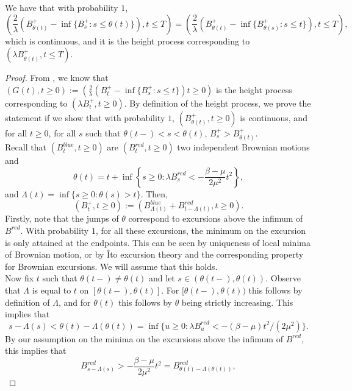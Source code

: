 \begin{lemma}\label{lemma.heightprocesstimechange}
We have that with probability $1$, $$\left(\frac{2}{\lambda} \left(B^+_{\theta (t)}-\inf\{B^+_{s}:s\leq \theta(t)\}\right), t\leq T \right)=\left(\frac{2}{\lambda} \left(B^+_{\theta (t)}-\inf\{B^+_{\theta(s)}:s\leq t\}\right), t\leq T \right),$$ which is continuous, and it is the height process corresponding to $\left(\lambda B^+_{\theta (t)},t\leq T\right)$. 
\end{lemma}
\begin{proof}
From \cite{legallRandomTreesApplications2005}, we know that $(G(t),t\geq 0):=\left(\frac{2}{\lambda} \left(B^+_{t}-\inf\{B^+_{s}:s\leq t\}\right)  t\geq 0 \right)$ is the height process corresponding to $\left(\lambda B^+_{t},t\geq 0\right)$. By definition of the height process, we prove the statement if we show that with probability $1$, $(B^+_{\theta(t)},t\geq 0)$ is continuous, and for all $t\geq 0$, for all $s$ such that $\theta(t-)<s<\theta(t)$, $ B^+_s > B^+_{\theta(t)}$. \\
Recall that $(B^{blue}_t, t \geq 0)$ are $(B^{red}_t, t\geq 0)$ two independent Brownian motions and  $$\theta(t)=t+\inf\left\{s\geq 0 : \lambda B^{red}_s< -\frac{\beta - \mu}{2\mu^2} t^2\right\},$$ and $\Lambda(t)=\inf\{s\geq 0:\theta(s)> t\}$. Then, \begin{equation*}\left(B^+_t,t \geq 0\right):=\left( B^{blue}_{\Lambda(t)}+ B^{red}_{t-\Lambda(t)}, t\geq 0\right).\end{equation*}
Firstly, note that the jumps of $\theta$ correspond to excursions above the infimum of $B^{red}$.  With probability $1$, for all these excursions, the minimum on the excursion is only attained at the endpoints. This can be seen by uniqueness of local minima of Brownian motion, or by \^Ito excursion theory and the corresponding property for Brownian excursions. We will assume that this holds.\\
Now fix $t$ such that $\theta(t-)\neq \theta(t)$ and let $s\in (\theta(t-),\theta(t))$. Observe that $\Lambda$ is equal to $t$ on $[\theta(t-),\theta(t)]$. For $[\theta(t-),\theta(t))$ this follows by definition of $\Lambda$, and for $\theta(t)$ this follows by $\theta$ being strictly increasing. This implies that $$s-\Lambda(s)<\theta(t)-\Lambda(\theta(t))=\inf\{ u\geq 0: \lambda B_u^{red}<-(\beta-\mu)t^2/(2\mu^2)\}.$$ By our assumption on the minima on the excursions above the infimum of $B^{red}$, this implies that $$B^{red}_{s-\Lambda(s)}>-\frac{\beta - \mu}{2\mu^2} t^2=B^{red}_{\theta(t)-\Lambda(\theta(t))},$$

\end{proof}
